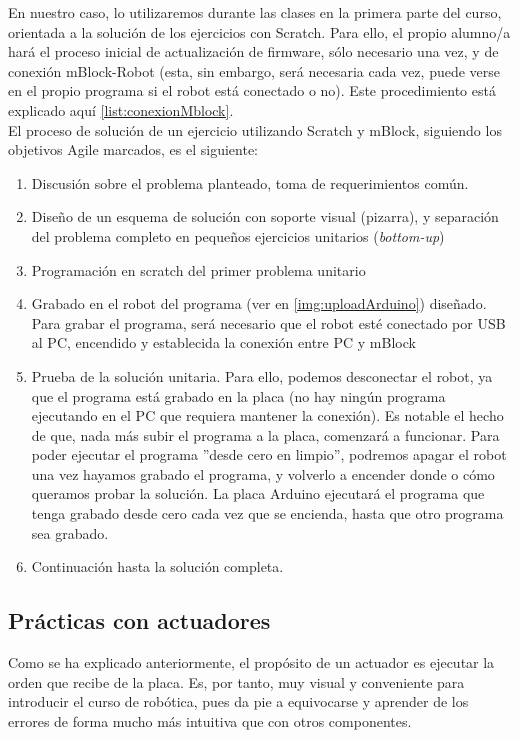 En nuestro caso, lo utilizaremos durante las clases en la primera parte del curso, orientada a la solución de los ejercicios con Scratch. 
Para ello, el propio alumno/a hará el proceso inicial de actualización de firmware, sólo necesario una vez, y de conexión mBlock-Robot (esta, sin embargo, será necesaria cada vez, puede verse en el propio programa si el robot está conectado o no). Este procedimiento está explicado aquí \ref{list:conexionMblock}. \\
El proceso de solución de un ejercicio utilizando Scratch y mBlock, siguiendo los objetivos Agile marcados, es el siguiente:
\begin{enumerate}
	\item Discusión sobre el problema planteado, toma de requerimientos común.
	\item Diseño de un esquema de solución con soporte visual (pizarra), y separación del problema completo en pequeños ejercicios unitarios (\textit{bottom-up})
	\item Programación en scratch del primer problema unitario
	\item Grabado en el robot del programa (ver en \ref{img:uploadArduino}) diseñado. Para grabar el programa, será necesario que el robot esté conectado por USB al PC, encendido y establecida la conexión entre PC y mBlock
	\item Prueba de la solución unitaria. Para ello, podemos desconectar el robot, ya que el programa está grabado en la placa (no hay ningún programa ejecutando en el PC que requiera mantener la conexión). Es notable el hecho de que, nada más subir el programa a la placa, comenzará a funcionar. Para poder ejecutar el programa ''desde cero en limpio'', podremos apagar el robot una vez hayamos grabado el programa, y volverlo a encender donde o cómo queramos probar la solución. La placa Arduino ejecutará el programa que tenga grabado desde cero cada vez que se encienda, hasta que otro programa sea grabado.
	\item Continuación hasta la solución completa.
\end{enumerate}
\subsection{Prácticas con actuadores} \label{subsec:practicasactuadores}
 Como se ha explicado anteriormente, el propósito de un actuador es ejecutar la orden que recibe de la placa. Es, por tanto, muy visual y conveniente para introducir el curso de robótica, pues da pie a equivocarse y aprender de los errores de forma mucho más intuitiva que con otros componentes.
 

